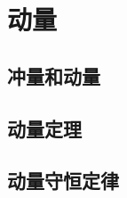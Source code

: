 \documentclass[color=purple,openany]{textbook-cn}
\begin{document}
\begin{Link}
\zhlipsum[1]
\end{Link}





\chaptersaying{\lipsum[1][9]}
\chapter{动量}


\begin{Block}[章节引入]
\lipsum[1-3]
\end{Block}

\section{冲量和动量}
\begin{Point}
\lipsum[2]
\end{Point}

\begin{Case}
\item \lipsum[1][3]
\item \lipsum[1][3]
\item \lipsum[1][3]
\item \lipsum[1][3]
\end{Case}

\begin{Link}
\zhlipsum[1]
\end{Link}




\section{动量定理}

\begin{Point}
\lipsum[2]
\end{Point}

\begin{Case}
\item \lipsum[1][3]
\item \lipsum[1][3]
\item \lipsum[1][3]
\item \lipsum[1][3]
\end{Case}

\begin{Link}
\zhlipsum[1]
\end{Link}



\section{动量守恒定律}
\end{document}
